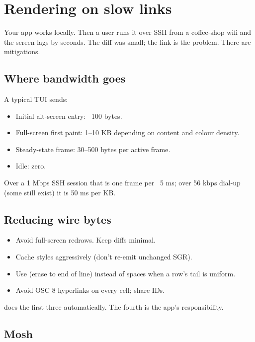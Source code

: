 \chapter{Rendering on slow links}
\label{ch:slowlinks}

\begin{aside}
Your app works locally. Then a user runs it over SSH from a
coffee-shop wifi and the screen lags by seconds. The diff was
small; the link is the problem. There are mitigations.
\end{aside}

\section{Where bandwidth goes}

A typical TUI sends:

\begin{itemize}[leftmargin=*]
  \item Initial alt-screen entry: ~100 bytes.
  \item Full-screen first paint: 1--10 KB depending on
    content and colour density.
  \item Steady-state frame: 30--500 bytes per active frame.
  \item Idle: zero.
\end{itemize}

Over a 1 Mbps SSH session that is one frame per ~5 ms; over
56 kbps dial-up (some still exist) it is 50 ms per KB.

\section{Reducing wire bytes}

\begin{itemize}[leftmargin=*]
  \item Avoid full-screen redraws. Keep diffs minimal.
  \item Cache styles aggressively (don't re-emit unchanged
    SGR).
  \item Use \code{ESC [ K} (erase to end of line) instead of
    spaces when a row's tail is uniform.
  \item Avoid OSC 8 hyperlinks on every cell; share IDs.
\end{itemize}

\maya{} does the first three automatically. The fourth is the
app's responsibility.

\section{Mosh}

